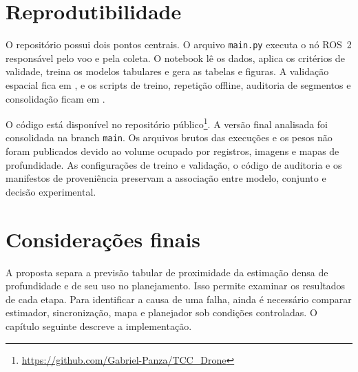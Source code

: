 \section{Reprodutibilidade}

O repositório possui dois pontos centrais. O arquivo \texttt{main.py} executa o nó ROS~2 responsável pelo voo e pela coleta. O notebook  lê os dados, aplica os critérios de validade, treina os modelos tabulares e gera as tabelas e figuras. A validação espacial fica em , e os scripts de treino, repetição offline, auditoria de segmentos e consolidação ficam em .

O código está disponível no repositório público\footnote{\url{https://github.com/Gabriel-Panza/TCC_Drone}}. A versão final analisada foi consolidada na branch \texttt{main}. Os arquivos brutos das execuções e os pesos não foram publicados devido ao volume ocupado por registros, imagens e mapas de profundidade. As configurações de treino e validação, o código de auditoria e os manifestos de proveniência preservam a associação entre modelo, conjunto e decisão experimental.

\section{Considerações finais}

A proposta separa a previsão tabular de proximidade da estimação densa de profundidade e de seu uso no planejamento. Isso permite examinar os resultados de cada etapa. Para identificar a causa de uma falha, ainda é necessário comparar estimador, sincronização, mapa e planejador sob condições controladas. O capítulo seguinte descreve a implementação.
